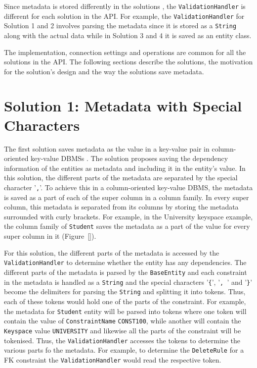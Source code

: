 		
		Since metadata is stored differently in the solutions , the
		\texttt{ValidationHandler} is different for each solution in the \ac{API}. For
		example,  the \texttt{ValidationHandler} for Solution 1 and 2 involves parsing
		the metadata  since it is stored as a \texttt{String} along
		with the actual data while in Solution 3 and 4 it is saved as an entity class.
		
		The implementation,  connection settings and operations 
		are common for all the solutions in the \ac{API}.  
		The following sections describe the solutions,  the motivation for the
		solution's design and the way the solutions save metadata. 
		
	
\section{Solution 1:  Metadata with Special Characters}\label{s:sol1}

	
	The first solution saves
	metadata as the value in a key-value pair  in
	column-oriented key-value \acp{DBMS} .
	The solution proposes saving the dependency information of the entities as
	metadata and including it in the entity's value.  In this solution, the
	different parts of the metadata
	are separated by the special character '\texttt{,}'.
	To achieve this in a column-oriented key-value \ac{DBMS}, the metadata is saved
	as a part of each of the super column  in a column family.
	In every super column,  this metadata is separated from its columns
	 by storing the metadata surrounded with curly brackets. For example,  in the
	 University keyspace example,  the column family of \texttt{Student} saves
	 the metadata as a part of the value  for every  super
	 column in it (Figure~\ref{}).


	For this solution,  the different parts of the metadata is
	accessed by the \texttt{ValidationHandler}  to determine whether the entity has
	any dependencies. The different parts of the metadata is parsed by the
	\texttt{BaseEntity} and each constraint in the metadata is handled as a
	\texttt{String} and the special characters '\texttt{\{}',  '\texttt{, }' and
	'\texttt{\}}' become the delimiters for parsing the \texttt{String} and
	splitting it into tokens. Thus, each of these tokens
	would hold one of the parts of the constraint. For example, the metadata for
	\texttt{Student} entity will be parsed into tokens where one token will
	contain the value of \texttt{ConstraintName} \texttt{CONST100}, while another
	will contain the \texttt{Keyspace} value \texttt{UNIVERSITY} and likewise all the
	parts of the constraint will be tokenised. Thus, the \texttt{ValidationHandler} accesses the tokens to determine the various parts fo the metadata. For example, to determine the \texttt{DeleteRule} for a
	\ac{FK} constraint the \texttt{ValidationHandler} would read the respective token.

